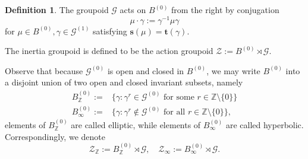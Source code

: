 \documentclass[a4paper]{amsart}
\newcommand{\ZZ}{\mathbb Z}
\newcommand{\maA}{\mathcal A}
\newcommand{\maC}{\mathcal C}
\newcommand{\maG}{\mathcal G}
\newcommand{\maZ}{\mathcal Z}
\newcommand{\bs}{\mathbf{s}}
\newcommand{\bt}{\mathbf{t}}
\newcommand\<{\langle}
\renewcommand\>{\rangle}
\newtheorem{lem}[theorem]{Lemma}
\theoremstyle{definition}
\newtheorem{dfn}[theorem]{Definition}
\theoremstyle{remark}
\begin{document}
%
%
%
%

\begin{dfn}\label{inertialgroupoid}
The groupoid $\maG$ acts on $B ^{(0)}$ from the right by conjugation
$$ \mu \cdot \gamma := \gamma ^{-1} \mu \gamma $$
for $\mu \in B ^{(0)}, \gamma \in \maG ^{(1)}$ satisfying $\bs (\mu) = \bt (\gamma )$.

The inertia groupoid is defined to be the action groupoid $\maZ := B ^{(0)} \rtimes \maG$.
\end{dfn}

Observe that because $\maG ^{(0)}$ is open and closed in $B ^{(0)}$,
we may write $B ^{(0)}$ into a disjoint union of two open and closed invariant subsets, namely
\begin{align*}
B ^{(0)} _\ZZ := & \{ \gamma : \gamma ^ r \in \maG ^{(0)} \text { for some $r \in \ZZ \setminus \{ 0 \}$} \} \\
B ^{(0)} _\infty := & \{ \gamma : \gamma ^ r \not \in \maG ^{(0)} \text { for all $r \in \ZZ \setminus \{ 0 \}$} \},
\end{align*}
elements of $B ^{(0)} _\ZZ $ are called elliptic, while elements of $B ^{(0)}_\infty $ are called hyperbolic.
Correspondingly, we denote
$$ \maZ _\ZZ := B ^{(0)} _\ZZ \rtimes \maG , \quad \maZ _\infty := B ^{(0)} _\infty \rtimes \maG .$$
\end{document}
